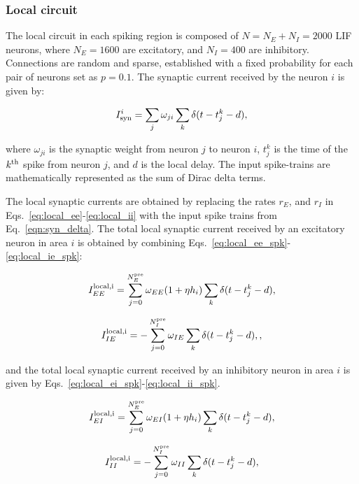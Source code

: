 \subsubsection{Local circuit}\label{local_circuit_spk} The local circuit in each spiking region is composed of $N=N_E+N_I=2000$ LIF neurons, where $N_E = 1600$ are excitatory, and $N_I = 400$ are inhibitory. Connections are random and sparse, established with a fixed probability for each pair of neurons set as $p=0.1$. The synaptic current received by the neuron $i$ is given by:

\begin{equation}
I_{\rm syn}^{i} =  \sum_{j} \omega_{ji}\sum_{k}\delta(t-t_{j}^{k}-d),
\label{eqn:syn_delta}
\end{equation}

\noindent  where $\omega_{ji}$ is the synaptic weight from neuron $j$ to neuron $i$, $t_{j}^{k}$ is the time of the $k^{\rm th}$ spike from neuron $j$, and $d$ is the local delay. The input spike-trains are mathematically represented as the sum of Dirac delta terms. 

The local synaptic currents are obtained by replacing the rates $r_E$, and $r_I$ in Eqs.~\ref{eq:local_ee}-\ref{eq:local_ii} with the input spike trains from Eq.~\ref{eqn:syn_delta}. The total local synaptic current received by an excitatory neuron in area $i$ is obtained by combining Eqs.~\ref{eq:local_ee_spk}-\ref{eq:local_ie_spk}:


\begin{equation}
        I^{\rm local,i}_{EE} = \sum_{j=0}^{N_{E}^{\rm pre}}\omega_{EE}(1+\eta h_{i})\sum_{k}\delta(t-t_{j}^{k}-d),
     \label{eq:local_ee_spk}
\end{equation}

\begin{equation}
        I^{\rm local,i}_{IE} = -\sum_{j=0}^{N_{I}^{\rm pre}}\omega_{IE}\sum_{k}\delta(t-t_{j}^{k}-d),
        \label{eq:local_ie_spk},
\end{equation}

\noindent and the total local synaptic current received by an inhibitory neuron in area $i$ is given by Eqs.~\ref{eq:local_ei_spk}-\ref{eq:local_ii_spk}.

\begin{equation}
        I^{\rm local,i}_{EI} = \sum_{j=0}^{N_{E}^{\rm pre}}\omega_{EI}(1+\eta h_{i})\sum_{k}\delta(t-t_{j}^{k}-d),
        \label{eq:local_ei_spk}
\end{equation}

\begin{equation}
        I^{\rm local,i}_{II} = -\sum_{j=0}^{N_{I}^{\rm pre}}\omega_{II}\sum_{k}\delta(t-t_{j}^{k}-d),
        \label{eq:local_ii_spk}
\end{equation}

